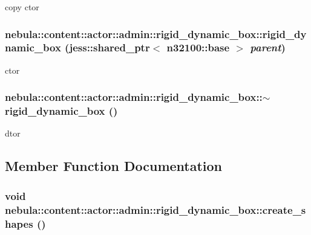 copy ctor \hypertarget{classnebula_1_1content_1_1actor_1_1admin_1_1rigid__dynamic__box_a8b5e6ab5f15321dd3530d4e91b68d4cf}{
\subsubsection[{rigid\_\-dynamic\_\-box}]{\setlength{\rightskip}{0pt plus 5cm}nebula::content::actor::admin::rigid\_\-dynamic\_\-box::rigid\_\-dynamic\_\-box (jess::shared\_\-ptr$<$ {\bf n32100::base} $>$ {\em parent})}}
\label{classnebula_1_1content_1_1actor_1_1admin_1_1rigid__dynamic__box_a8b5e6ab5f15321dd3530d4e91b68d4cf}


ctor \hypertarget{classnebula_1_1content_1_1actor_1_1admin_1_1rigid__dynamic__box_a49deea3c5a05b7b84735aecedb02cdea}{
\subsubsection[{$\sim$rigid\_\-dynamic\_\-box}]{\setlength{\rightskip}{0pt plus 5cm}nebula::content::actor::admin::rigid\_\-dynamic\_\-box::$\sim$rigid\_\-dynamic\_\-box ()}}
\label{classnebula_1_1content_1_1actor_1_1admin_1_1rigid__dynamic__box_a49deea3c5a05b7b84735aecedb02cdea}


dtor 

\subsection{Member Function Documentation}
\hypertarget{classnebula_1_1content_1_1actor_1_1admin_1_1rigid__dynamic__box_ad0aba702fbf1cb38fabc3b84f6a2ef93}{
\subsubsection[{create\_\-shapes}]{\setlength{\rightskip}{0pt plus 5cm}void nebula::content::actor::admin::rigid\_\-dynamic\_\-box::create\_\-shapes ()}}
\label{classnebula_1_1content_1_1actor_1_1admin_1_1rigid__dynamic__box_ad0aba702fbf1cb38fabc3b84f6a2ef93}


